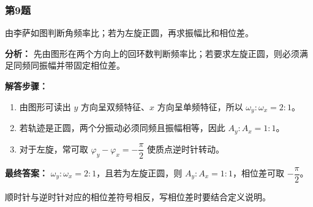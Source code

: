 \documentclass[12pt,a4paper]{ctexart}
\begin{document}
\subsubsection*{第9题}
\begin{tcolorbox}[colback=gray!2!white,colframe=black!60,title={题目}]
由李萨如图判断角频率比；若为左旋正圆，再求振幅比和相位差。\par
\end{tcolorbox}
\begin{tcolorbox}[colback=blue!2!white,colframe=blue!55!black,title={完整答案}]
\textbf{分析：}
先由图形在两个方向上的回环数判断频率比；若要求左旋正圆，则必须满足同频同振幅并带固定相位差。\par
\textbf{解答步骤：}
\begin{enumerate}
\item 由图形可读出 \(y\) 方向呈双频特征、\(x\) 方向呈单频特征，所以 \(\omega_y:\omega_x=2:1\)。
\item 若轨迹是正圆，两个分振动必须同频且振幅相等，因此 \(A_y:A_x=1:1\)。
\item 对于左旋，常可取 \(\varphi_y-\varphi_x=-\dfrac{\pi}{2}\) 使质点逆时针转动。
\end{enumerate}
\textbf{最终答案：}
\(\omega_y:\omega_x=2:1\)，且若为左旋正圆，则 \(A_y:A_x=1:1\)，相位差可取 \(-\dfrac{\pi}{2}\)。\par
\end{tcolorbox}
\begin{tcolorbox}[colback=red!2!white,colframe=red!55!black,title={易错点}]
顺时针与逆时针对应的相位差符号相反，写相位差时要结合定义说明。\par
\end{tcolorbox}
\end{document}
